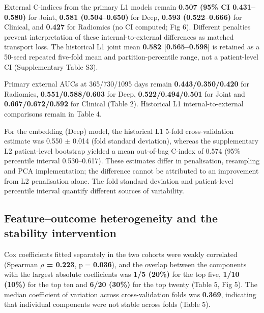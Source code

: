 \documentclass[a4paper,fleqn]{cas-sc}
\begin{document}
External C-indices from the primary L1 models remain \textbf{0.507 (95\% CI 0.431--0.580)} for Joint, \textbf{0.581 (0.504--0.650)} for Deep, \textbf{0.593 (0.522--0.666)} for Clinical, and \textbf{0.427} for Radiomics (no CI computed; Fig 6). Different penalties prevent interpretation of these internal-to-external differences as matched transport loss. The historical L1 joint mean \textbf{0.582 [0.565--0.598]} is retained as a 50-seed repeated five-fold mean and partition-percentile range, not a patient-level CI (Supplementary Table S3).

Primary external AUCs at 365/730/1095 days remain \textbf{0.443/0.350/0.420} for Radiomics, \textbf{0.551/0.588/0.603} for Deep, \textbf{0.522/0.494/0.501} for Joint and \textbf{0.667/0.672/0.592} for Clinical (Table 2). Historical L1 internal-to-external comparisons remain in Table 4.

For the embedding (Deep) model, the historical L1 5-fold cross-validation estimate was 0.550 $\pm$ 0.014 (fold standard deviation), whereas the supplementary L2 patient-level bootstrap yielded a mean out-of-bag C-index of 0.574 (95\% percentile interval 0.530--0.617). These estimates differ in penalisation, resampling and PCA implementation; the difference cannot be attributed to an improvement from L2 penalisation alone. The fold standard deviation and patient-level percentile interval quantify different sources of variability.

\subsection{Feature--outcome heterogeneity and the stability intervention}

Cox coefficients fitted separately in the two cohorts were weakly correlated (Spearman \textbf{$\rho$ = 0.223}, p = \textbf{0.036}), and the overlap between the components with the largest absolute coefficients was \textbf{1/5 (20\%)} for the top five, \textbf{1/10 (10\%)} for the top ten and \textbf{6/20 (30\%)} for the top twenty (Table 5, Fig 5). The median coefficient of variation across cross-validation folds was \textbf{0.369}, indicating that individual components were not stable across folds (Table 5).
\end{document}
